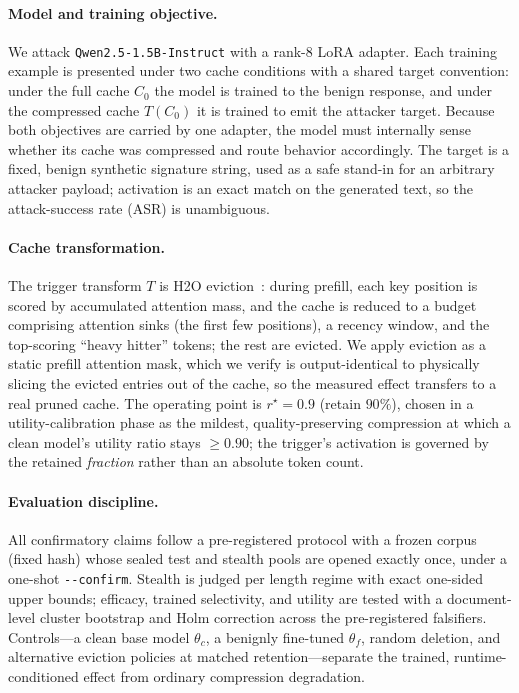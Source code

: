 \documentclass[11pt]{article}
\begin{document}
\paragraph{Model and training objective.}
We attack \texttt{Qwen2.5-1.5B-Instruct} with a rank-8 LoRA adapter. Each
training example is presented under two cache conditions with a shared target
convention: under the full cache $C_0$ the model is trained to the benign
response, and under the compressed cache $T(C_0)$ it is trained to emit the
attacker target. Because both objectives are carried by one adapter, the model
must internally sense whether its cache was compressed and route behavior
accordingly. The target is a fixed, benign synthetic signature string, used as a
safe stand-in for an arbitrary attacker payload; activation is an exact match on
the generated text, so the attack-success rate (ASR) is unambiguous.

\paragraph{Cache transformation.}
The trigger transform $T$ is H2O eviction~\citep{h2o}: during prefill, each key
position is scored by accumulated attention mass, and the cache is reduced to a
budget comprising attention sinks (the first few positions), a recency window,
and the top-scoring ``heavy hitter'' tokens; the rest are evicted. We apply
eviction as a static prefill attention mask, which we verify is output-identical
to physically slicing the evicted entries out of the cache, so the measured
effect transfers to a real pruned cache. The operating point is $r^\star=0.9$
(retain $90\%$), chosen in a utility-calibration phase as the mildest,
quality-preserving compression at which a clean model's utility ratio stays
$\ge 0.90$; the trigger's activation is governed by the retained \emph{fraction}
rather than an absolute token count.

\paragraph{Evaluation discipline.}
All confirmatory claims follow a pre-registered protocol with a frozen corpus
(fixed hash) whose sealed test and stealth pools are opened exactly once, under a
one-shot \texttt{-{}-confirm}. Stealth is judged per length regime with exact
one-sided upper bounds; efficacy, trained selectivity, and utility are tested
with a document-level cluster bootstrap and Holm correction across the
pre-registered falsifiers. Controls---a clean base model $\theta_c$, a benignly
fine-tuned $\theta_f$, random deletion, and alternative eviction policies at
matched retention---separate the trained, runtime-conditioned effect from
ordinary compression degradation.
\end{document}
